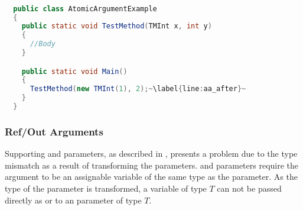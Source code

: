 \begin{lstlisting}[label=lst:after_atomic_argument,
  caption={\bscode{atomic} Argument After Transformation},
  language=Java,  
  showspaces=false,
  showtabs=false,
  breaklines=true,
  showstringspaces=false,
  breakatwhitespace=true,
  escapechar=~,
  commentstyle=\color{greencomments},
  keywordstyle=\color{bluekeywords},
  stringstyle=\color{redstrings},
  morekeywords={atomic, retry, orelse, var, get, set, ret, out}]  % Start your code-block

  public class AtomicArgumentExample
  {
    public static void TestMethod(TMInt x, int y)
    {
      //Body
    }

    public static void Main()
    {
      TestMethod(new TMInt(1), 2);~\label{line:aa_after}~
    }
  }
\end{lstlisting}

\subsubsection{Ref/Out Arguments}
Supporting   and  parameters, as described in , presents a problem due to the type mismatch as a result of transforming the parameters.  and  parameters require the argument to be an assignable variable of the same type as the parameter. As the type of the parameter is transformed, a variable of type $T$ can not be passed directly as  or  to an  parameter of type $T$.

